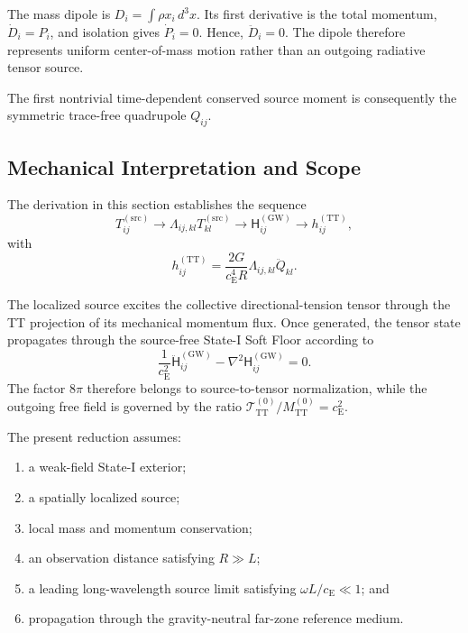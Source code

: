 The mass dipole is $D_{i} = \int \rho x_{i} \,d^{3}x$. Its first derivative is the total momentum, $\dot{D}_{i} = P_{i}$, and isolation gives $\dot{P}_{i} = 0$. Hence, $\ddot{D}_{i} = 0$. The dipole therefore represents uniform center-of-mass motion rather than an outgoing radiative tensor source.

The first nontrivial time-dependent conserved source moment is consequently the symmetric trace-free quadrupole $Q_{ij}$.

\subsection{Mechanical Interpretation and Scope}
\label{subsec:n8_scope}

The derivation in this section establishes the sequence
\begin{equation}
    T_{ij}^{(\mathrm{src})} \longrightarrow \Lambda_{ij,kl} T_{kl}^{(\mathrm{src})} \longrightarrow \mathsf{H}_{ij}^{(\mathrm{GW})} \longrightarrow h_{ij}^{(\mathrm{TT})},
\end{equation}
with
\begin{equation}
    h_{ij}^{(\mathrm{TT})} = \frac{2G}{ c_{\mathrm{E}}^{4}R } \Lambda_{ij,kl} \ddot{Q}_{kl}.
\end{equation}

The localized source excites the collective directional-tension tensor through the TT projection of its mechanical momentum flux. Once generated, the tensor state propagates through the source-free State-I Soft Floor according to
\begin{equation}
    \frac{1}{c_{\mathrm{E}}^{2}} \ddot{\mathsf{H}}_{ij}^{(\mathrm{GW})} - \nabla^{2} \mathsf{H}_{ij}^{(\mathrm{GW})} = 0.
\end{equation}
The factor $8\pi$ therefore belongs to source-to-tensor normalization, while the outgoing free field is governed by the ratio $\mathcal{T}_{\mathrm{TT}}^{(0)} / M_{\mathrm{TT}}^{(0)} = c_{\mathrm{E}}^{2}$.

The present reduction assumes:
\begin{enumerate}
    \item a weak-field State-I exterior;
    \item a spatially localized source;
    \item local mass and momentum conservation;
    \item an observation distance satisfying $R\gg L$;
    \item a leading long-wavelength source limit satisfying $\omega L/c_{\mathrm{E}}\ll1$; and
    \item propagation through the gravity-neutral far-zone reference medium.
\end{enumerate}

